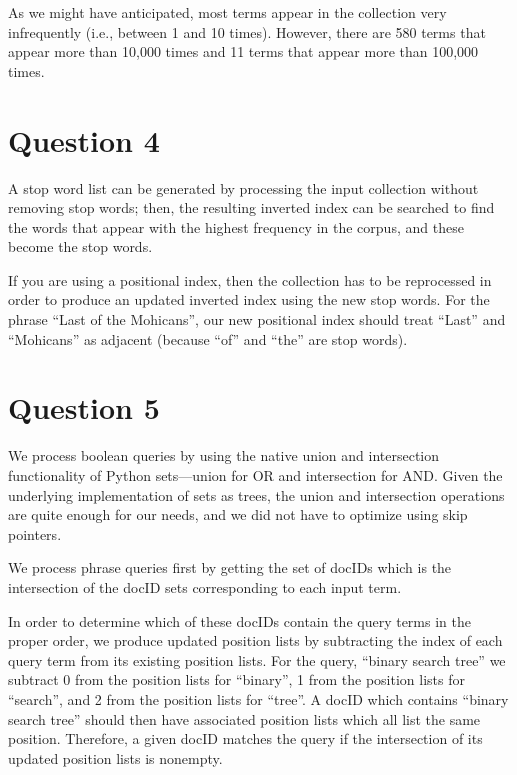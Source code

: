 \documentclass[11pt]{article}
\begin{document}
\flushleft
As we might have anticipated, most terms appear in the collection very infrequently (i.e., between
1 and 10 times). However, there are 580 terms that appear more than 10,000 times and 11 terms
that appear more than 100,000 times.

\section{Question 4}

A stop word list can be generated by processing the input collection without removing stop words;
then, the resulting inverted index can be searched to find the words that appear with the highest
frequency in the corpus, and these become the stop words. 

If you are using a positional index, then the collection has to be reprocessed in order to produce
an updated inverted index using the new stop words. For the phrase ``Last of the Mohicans'', our new
positional index should treat ``Last'' and ``Mohicans'' as adjacent (because ``of'' and ``the'' are stop words).

\section{Question 5}

We process boolean queries by using the native union and intersection functionality of Python sets---union for OR
and intersection for AND. Given the underlying implementation of sets as trees, the union and intersection operations
are quite enough for our needs, and we did not have to optimize using skip pointers.

We process phrase queries first by getting the set of docIDs which is the intersection of the docID sets corresponding
to each input term.

In order to determine which of these docIDs contain the query terms in the proper order, we produce updated position lists by subtracting
the index of each query term from its existing position lists. For the query, ``binary search tree'' we subtract 0 from
the position lists for ``binary'', 1 from the position lists for ``search'', and 2 from the position lists for ``tree''.
A docID which contains ``binary search tree'' should then have associated position lists which all list the same position.
Therefore, a given docID matches the query if the intersection of its updated position lists is nonempty.
\end{document}
